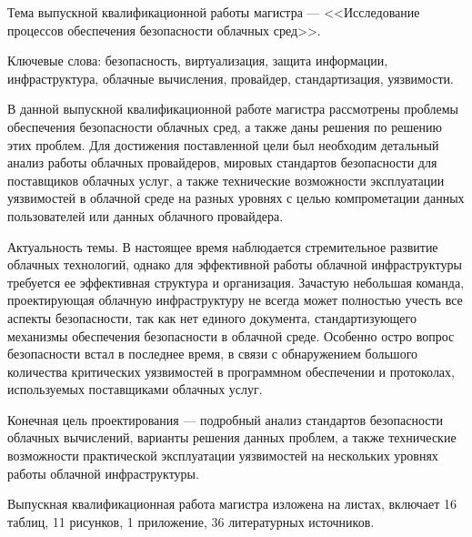 
Тема выпускной квалификационной работы магистра --- <<Исследование процессов обеспечения безопасности облачных сред>>.

Ключевые слова: безопасность, виртуализация, защита информации, инфраструктура, облачные вычисления, провайдер, стандартизация, уязвимости.

В данной выпускной квалификационной работе магистра рассмотрены проблемы обеспечения безопасности облачных сред, а также даны решения по решению этих проблем.
Для достижения поставленной цели был необходим детальный анализ работы облачных провайдеров, мировых стандартов безопасности для поставщиков облачных услуг, а также технические возможности эксплуатации уязвимостей в облачной среде на разных уровнях с целью компрометации данных пользователей или данных облачного провайдера.

Актуальность темы.
В настоящее время наблюдается стремительное развитие облачных технологий, однако для эффективной работы облачной инфраструктуры требуется ее эффективная структура и организация.
Зачастую небольшая команда, проектирующая облачную инфраструктуру не всегда может полностью учесть все аспекты безопасности, так как нет единого документа, стандартизующего механизмы обеспечения безопасности в облачной среде.
Особенно остро вопрос безопасности встал в последнее время, в связи с обнаружением большого количества критических уязвимостей в программном обеспечении и протоколах, используемых поставщиками облачных услуг.

Конечная цель проектирования --- подробный анализ стандартов безопасности облачных вычислений, варианты решения данных проблем, а также технические возможности практической эксплуатации уязвимостей на нескольких уровнях работы облачной инфраструктуры.

Выпускная квалификационная работа магистра изложена на \pageref{LastPage} листах, включает 16 таблиц, 11 рисунков, 1 приложение, 36 литературных источников.

\clearpage
